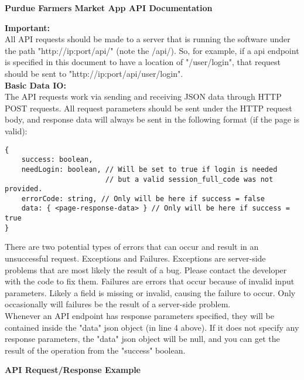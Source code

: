 \documentclass{article}[11pt]
\begin{document}
\vspace{.1in}

\centerline{\textbf{Purdue Farmers Market App API Documentation}} \bigskip

\textbf{Important: } \\ All API requests should be made to a server that is running the software under the path "http://ip:port/api/" (note the /api/). So, for example, if a api endpoint is specified in this document to have a location of "/user/login", that request should be sent to "http://ip:port/api/user/login". \\

\textbf{Basic Data IO:} \\
The API requests work via sending and receiving JSON data through HTTP POST requests. All request parameters should be sent under the HTTP request body, and response data will always be sent in the following format (if the page is valid):

\begin{verbatim}
{
    success: boolean,
    needLogin: boolean, // Will be set to true if login is needed
                        // but a valid session_full_code was not provided.
    errorCode: string, // Only will be here if success = false
    data: { <page-response-data> } // Only will be here if success = true
}
\end{verbatim}

There are two potential types of errors that can occur and result in an unsuccessful request. Exceptions and Failures. Exceptions are server-side problems that are most likely the result of a bug. Please contact the developer with the code to fix them. Failures are errors that occur because of invalid input parameters. Likely a field is missing or invalid, causing the failure to occur. Only occasionally will failures be the result of a server-side problem. \\

Whenever an API endpoint has response parameters specified, they will be contained inside the "data" json object (in line 4 above). If it does not specify any response parameters, the "data" json object will be null, and you can get the result of the operation from the "success" boolean. \\

\newpage

\textbf{API Request/Response Example} \\
\end{document}
